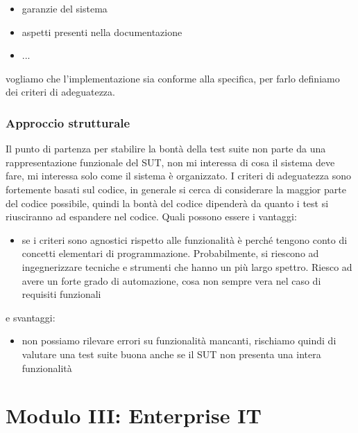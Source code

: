 \documentclass{article}
\begin{document}
\begin{itemize}
\item garanzie del sistema
\item aspetti presenti nella documentazione
\item ...
\end{itemize}
vogliamo che l'implementazione sia conforme alla specifica, per farlo definiamo dei criteri di adeguatezza.
\subsubsection{Approccio strutturale}
Il punto di partenza per stabilire la bontà della test suite non parte da una rappresentazione funzionale del SUT, non mi interessa di cosa il sistema deve fare, mi interessa solo come il sistema è organizzato. I criteri di adeguatezza sono fortemente basati sul codice, in generale si cerca di considerare la maggior parte del codice possibile, quindi la bontà del codice dipenderà da quanto i test si riusciranno ad espandere nel codice. Quali possono essere i vantaggi:
\begin{itemize}
\item se i criteri sono agnostici rispetto alle funzionalità è perché tengono conto di concetti elementari di programmazione. Probabilmente, si riescono ad ingegnerizzare tecniche e strumenti che hanno un più largo spettro. Riesco ad avere un forte grado di automazione, cosa non sempre vera nel caso di requisiti funzionali
\end{itemize}
e svantaggi: 
\begin{itemize}
\item non possiamo rilevare errori su funzionalità mancanti, rischiamo quindi di valutare una test suite buona anche se il SUT non presenta una intera funzionalità
\end{itemize}




\newpage
\section{Modulo III: Enterprise IT}
\end{document}

